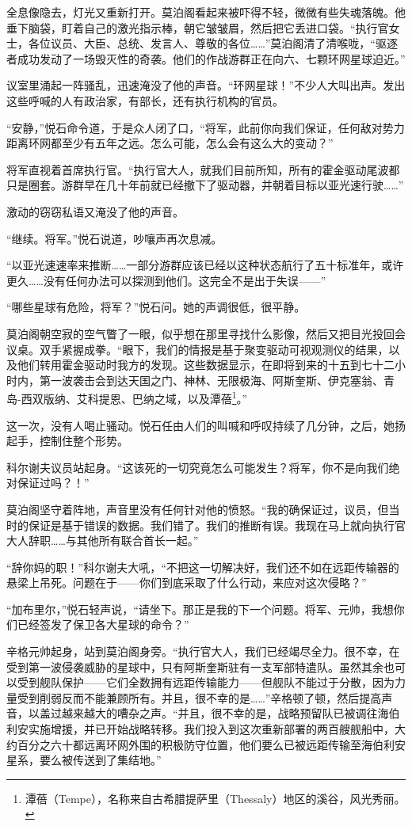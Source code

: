 \documentclass[AutoFakeBold=true]{book}
\begin{document}
全息像隐去，灯光又重新打开。莫泊阁看起来被吓得不轻，微微有些失魂落魄。他垂下脑袋，盯着自己的激光指示棒，朝它皱皱眉，然后把它丢进口袋。``执行官女士，各位议员、大臣、总统、发言人、尊敬的各位……''莫泊阁清了清喉咙，``驱逐者成功发动了一场毁灭性的奇袭。他们的作战游群正在向六、七颗环网星球迫近。''

议室里涌起一阵骚乱，迅速淹没了他的声音。``环网星球！''不少人大叫出声。发出这些呼喊的人有政治家，有部长，还有执行机构的官员。

``安静，''悦石命令道，于是众人闭了口，``将军，此前你向我们保证，任何敌对势力距离环网都至少有五年之远。怎么可能，怎么会有这么大的变动？''

将军直视着首席执行官。``执行官大人，就我们目前所知，所有的霍金驱动尾波都只是圈套。游群早在几十年前就已经撤下了驱动器，并朝着目标以亚光速行驶……''

激动的窃窃私语又淹没了他的声音。

``继续。将军。''悦石说道，吵嚷声再次息减。

``以亚光速速率来推断……一部分游群应该已经以这种状态航行了五十标准年，或许更久……没有任何办法可以探测到他们。这完全不是出于失误——''

``哪些星球有危险，将军？''悦石问。她的声调很低，很平静。

莫泊阁朝空寂的空气瞥了一眼，似乎想在那里寻找什么影像，然后又把目光投回会议桌。双手紧握成拳。``眼下，我们的情报是基于聚变驱动可视观测仪的结果，以及他们转用霍金驱动时我方的发现。这些数据显示，在即将到来的十五到七十二小时内，第一波袭击会到达天国之门、神林、无限极海、阿斯奎斯、伊克塞翁、青岛-西双版纳、艾科提恩、巴纳之域，以及潭蓓\footnote{潭蓓（Tempe），名称来自古希腊提萨里（Thessaly）地区的溪谷，风光秀丽。}。''

这一次，没有人喝止骚动。悦石任由人们的叫喊和呼叹持续了几分钟，之后，她扬起手，控制住整个形势。

科尔谢夫议员站起身。``这该死的一切究竟怎么可能发生？将军，你不是向我们绝对保证过吗？！''

莫泊阁坚守着阵地，声音里没有任何针对他的愤怒。``我的确保证过，议员，但当时的保证是基于错误的数据。我们错了。我们的推断有误。我现在马上就向执行官大人辞职……与其他所有联合首长一起。''

``{\kaishu 辞你妈的职！}''科尔谢夫大吼，``不把这一切解决好，我们还不如在远距传输器的悬梁上吊死。问题在于——你们到底{\kaishu 采取了什么行动}，来应对这次侵略？''

``加布里尔，''悦石轻声说，``请坐下。那正是我的下一个问题。将军、元帅，我想你们已经签发了保卫各大星球的命令？''

辛格元帅起身，站到莫泊阁身旁。``执行官大人，我们已经竭尽全力。很不幸，在受到第一波侵袭威胁的星球中，只有阿斯奎斯驻有一支军部特遣队。虽然其余也可以受到舰队保护——它们全数拥有远距传输能力——但舰队不能过于分散，因为力量受到削弱反而不能兼顾所有。并且，很不幸的是……''辛格顿了顿，然后提高声音，以盖过越来越大的嘈杂之声。``并且，很不幸的是，战略预留队已被调往海伯利安实施增援，并已开始战略转移。我们投入到这次重新部署的两百艘舰船中，大约百分之六十都远离环网外围的积极防守位置，他们要么已被远距传输至海伯利安星系，要么被传送到了集结地。''
\end{document}
